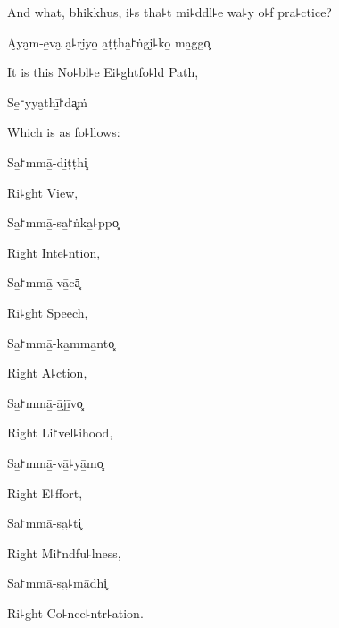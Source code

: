 \begin{english}
  And what, bhikkhus, i꜕s tha꜕t mi꜕ddl꜕e wa꜕y o꜕f pra꜕ctice?
\end{english}

A̮ya̮m-e̱va̮ a̮꜕ri̮yo̱ a̱ṭṭha̱꜓ṅgi̮꜕ko̱ ma̱ggo͓

\begin{english}
  It is this No꜕bl꜕e Ei꜕ghtfo꜕ld Path,
\end{english}

Se̱꜓yya̮thī̱꜓da͓ṁ

\begin{english}
  Which is as fo꜕llows:
\end{english}

Sa̱꜓mmā̱-di̱ṭṭhi͓

\begin{english}
  Ri꜕ght View,
\end{english}

Sa̱꜓mmā̱-sa̱꜓ṅka̱꜕ppo͓

\begin{english}
  Right Inte꜕ntion,
\end{english}

Sa̱꜓mmā̱-vā̱cā͓

\begin{english}
  Ri꜕ght Speech,
\end{english}

\ifaivedition
\clearpage
\fi

Sa̱꜓mmā̱-ka̱mma̱nto͓

\begin{english}
  Right A꜕ction,
\end{english}

Sa̱꜓mmā̱-ā̱jī̱vo͓

\begin{english}
  Right Li꜓vel꜕ihood,
\end{english}

Sa̱꜓mmā̱-vā̱꜕yā̱mo͓

\begin{english}
  Right E꜕ffort,
\end{english}

Sa̱꜓mmā̱-sa̮꜕ti͓

\begin{english}
  Right Mi꜓ndfu꜕lness,
\end{english}

Sa̱꜓mmā̱-sa̮꜕mā̱dhi͓

\begin{english}
  Ri꜕ght Co꜕nce꜕ntr꜕ation.
\end{english}

